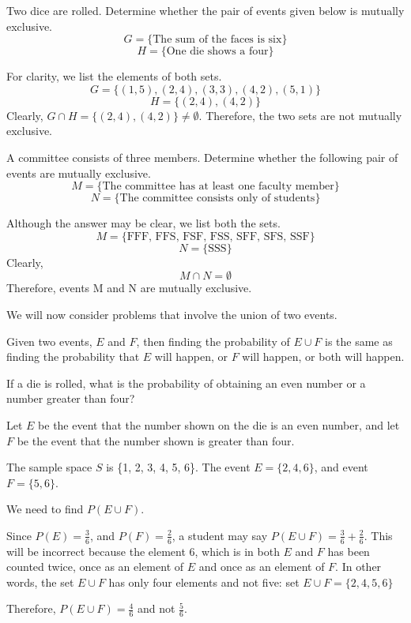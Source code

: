 \begin{example}
    Two dice are rolled. Determine whether the pair of events given below is mutually exclusive.
    \[ G = \{\text{The sum of the faces is six}\} \]
    \[ H = \{\text{One die shows a four}\} \]
\end{example}
\begin{solution}
    For clarity, we list the elements of both sets.
    \[ G = \{(1,5), (2,4), (3,3), (4,2), (5,1)\} \]
    \[ H = \{(2,4), (4,2)\} \]
    Clearly, \( G \cap H = \{(2,4), (4,2)\} \neq \emptyset. \)
    Therefore, the two sets are not mutually exclusive.
\end{solution}

\begin{example}
    A committee consists of three members. Determine whether the following pair of events are mutually exclusive.
    \[ M = \{\text{The committee has at least one faculty member}\} \]
    \[ N = \{\text{The committee consists only of students}\} \]
\end{example}
\begin{solution}
    Although the answer may be clear, we list both the sets.
    \[ M = \{\text{FFF, FFS, FSF, FSS, SFF, SFS, SSF}\} \]
    \[ N = \{\text{SSS}\} \]
    Clearly,
    \[ M \cap N = \emptyset \]
    Therefore, events M and N are mutually exclusive.
\end{solution}

We will now consider problems that involve the union of two events.

Given two events, \( E \) and \( F \), then finding the probability of \( E \cup F \) is the same as finding the probability that \( E \) will happen, or \( F \) will happen, or both will happen.

\begin{example}\label{example_probability_union_dice_roll}
    If a die is rolled, what is the probability of obtaining an even number or a number greater than four?
\end{example}
\begin{solution}
    Let \( E \) be the event that the number shown on the die is an even number, and let \( F \) be the event that the number shown is greater than four.

    The sample space \( S \) is \{1, 2, 3, 4, 5, 6\}. The event \( E = \{2, 4, 6\} \), and event \( F = \{5, 6\} \).

    We need to find \( P(E \cup F) \).

    Since \( P(E) = \frac{3}{6} \), and \( P(F) = \frac{2}{6} \), a student may say \( P(E \cup F) = \frac{3}{6} + \frac{2}{6} \). This will be incorrect because the element 6, which is in both \( E \) and \( F \) has been counted twice, once as an element of \( E \) and once as an element of \( F \). In other words, the set \( E \cup F \) has only four elements and not five: set \( E \cup F = \{2,4,5,6\} \)

    Therefore, \( P(E \cup F) = \frac{4}{6} \) and not \( \frac{5}{6} \).
\end{solution}

